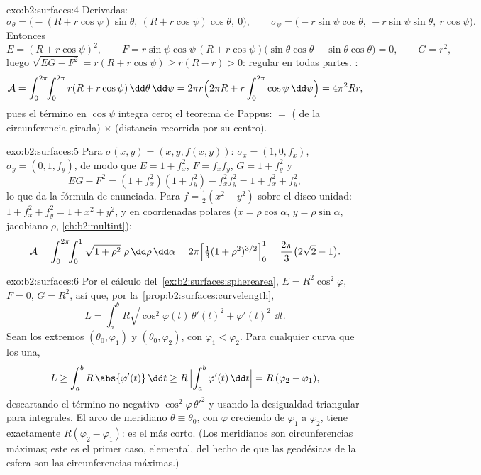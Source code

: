\begin{solution}{exo:b2:surfaces:4}
Derivadas:
\[
\sigma_\theta = \bigl(-(R + r\cos\psi)\sin\theta,\
(R + r\cos\psi)\cos\theta,\ 0\bigr),
\qquad
\sigma_\psi = \bigl(-r\sin\psi\cos\theta,\
-r\sin\psi\sin\theta,\ r\cos\psi\bigr).
\]
Entonces
\[
E = (R + r\cos\psi)^2,
\qquad
F = r\sin\psi\cos\psi\,(R + r\cos\psi)
\bigl(\sin\theta\cos\theta - \sin\theta\cos\theta\bigr) = 0,
\qquad
G = r^2 ,
\]
luego $\sqrt{EG - F^2} = r(R + r\cos\psi) \geq r(R - r) > 0$: regular
en todas partes. :
\[
\mathcal{A}
= \int_0^{2\pi}\!\!\int_0^{2\pi} r(R + r\cos\psi)
\,\dd\theta\,\dd\psi
= 2\pi r \Bigl(2\pi R + r\int_0^{2\pi}\cos\psi\,\dd\psi\Bigr)
= 4\pi^2 R r ,
\]
pues el término en $\cos\psi$ integra cero; el teorema de Pappus:
 $=$ ( de la circunferencia girada) $\times$ (distancia
recorrida por su centro).
\end{solution}

\begin{solution}{exo:b2:surfaces:5}
Para $\sigma(x, y) = (x, y, f(x,y))$: $\sigma_x = (1, 0, f_x)$,
$\sigma_y = (0, 1, f_y)$, de modo que $E = 1 + f_x^2$, $F = f_xf_y$,
$G = 1 + f_y^2$ y
\[
EG - F^2 = (1 + f_x^2)(1 + f_y^2) - f_x^2f_y^2
= 1 + f_x^2 + f_y^2 ,
\]
lo que da la fórmula de  enunciada. Para $f = \frac12(x^2 +
y^2)$ sobre el disco unidad: $1 + f_x^2 + f_y^2 = 1 + x^2 + y^2$, y
en coordenadas polares ($x = \rho\cos\alpha$, $y = \rho\sin\alpha$,
jacobiano $\rho$, \cref{ch:b2:multint}):
\[
\mathcal{A}
= \int_0^{2\pi}\!\!\int_0^1 \sqrt{1 + \rho^2}\;\rho
\,\dd\rho\,\dd\alpha
= 2\pi\Bigl[\tfrac13(1 + \rho^2)^{3/2}\Bigr]_0^1
= \frac{2\pi}{3}\bigl(2\sqrt2 - 1\bigr).
\]
\end{solution}

\begin{solution}{exo:b2:surfaces:6}
Por el cálculo del~\cref{ex:b2:surfaces:spherearea}, $E =
R^2\cos^2\varphi$, $F = 0$, $G = R^2$, así que, por la~\cref{prop:b2:surfaces:curvelength},
\[
L = \int_a^b R\sqrt{\cos^2\varphi(t)\,\theta'(t)^2
+ \varphi'(t)^2}\;\dd t .
\]
Sean los extremos $(\theta_0, \varphi_1)$ y $(\theta_0, \varphi_2)$,
con $\varphi_1 < \varphi_2$. Para cualquier curva que los una,
\[
L \geq \int_a^b R\,\abs{\varphi'(t)}\,\dd t
\geq R\,\Bigl|\int_a^b \varphi'(t)\,\dd t\Bigr|
= R\,(\varphi_2 - \varphi_1),
\]
descartando el término no negativo $\cos^2\varphi\,\theta'^2$ y
usando la desigualdad triangular para integrales. El arco de
meridiano $\theta \equiv \theta_0$, con $\varphi$ creciendo de
$\varphi_1$ a $\varphi_2$, tiene  exactamente $R(\varphi_2 -
\varphi_1)$: es el más corto. (Los meridianos son circunferencias
máximas; este es el primer caso, elemental, del hecho de que las
geodésicas de la esfera son las circunferencias máximas.)
\end{solution}

